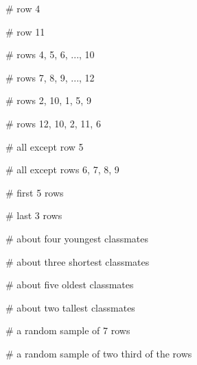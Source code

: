 \documentclass[
  letterpaper,
  DIV=11,
  numbers=noendperiod]{scrreprt}
\newenvironment{Shaded}{\begin{snugshade}}{\end{snugshade}}
\newcommand{\CommentTok}[1]{\textcolor[rgb]{0.37,0.37,0.37}{#1}}
\begin{document}
\begin{Shaded}
\begin{Highlighting}[]
\CommentTok{\# row 4}

\CommentTok{\# row 11}

\CommentTok{\# rows 4, 5, 6, ..., 10}

\CommentTok{\# rows 7, 8, 9, ..., 12}

\CommentTok{\# rows 2, 10, 1, 5, 9}

\CommentTok{\# rows 12, 10, 2, 11, 6}

\CommentTok{\# all except row 5}

\CommentTok{\# all except rows 6, 7, 8, 9}

\CommentTok{\# first 5 rows}

\CommentTok{\# last 3 rows}

\CommentTok{\# about four youngest classmates}

\CommentTok{\# about three shortest classmates}

\CommentTok{\# about five oldest classmates}

\CommentTok{\# about two tallest classmates}

\CommentTok{\# a random sample of 7 rows}

\CommentTok{\# a random sample of two third of the rows}
\end{Highlighting}
\end{Shaded}
\end{document}
